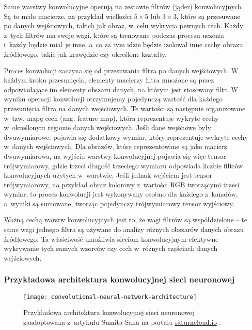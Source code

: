 Same warstwy konwolucyjne operują na zestawie filtrów (jąder) konwolucyjnych.
Są to małe macierze, na przykład wielkości $5 \times 5$ lub $3 \times 3$, które są przesuwane po danych wejściowych, takich jak obraz, w~celu wykrycia pewnych cech.
Każdy z~tych filtrów ma swoje wagi, które są trenowane podczas procesu uczenia i~każdy będzie miał je inne, a~co za tym idzie będzie izolował inne cechy obrazu źródłowego, takie jak krawędzie czy określone kształty.

Proces konwolucji zaczyna się od przesuwania filtra po danych wejściowych.
W każdym kroku przesunięcia, elementy macierzy filtra mnożone są przez odpowiadające im elementy obszaru danych, na którym jest stosowany filtr.
W wyniku operacji konwolucji otrzymujemy pojedynczą wartość dla każdego przesunięcia filtra na danych wejściowych.
Te wartości są następnie organizowane w~tzw. mapę cech (ang. feature map), która reprezentuje wykryte cechy w~określonym regionie danych wejściowych.
Jeśli dane wejściowe były dwuwymiarowe, pojawia się dodatkowy wymiar, który reprezentuje wykryte cechy w~danych wejściowych.
Dla obrazów, które reprezentowane są jako macierz dwuwymiarowa, na wyjściu warstwy konwolucyjnej pojawia się więc tensor trójwymiarowy, gdzie trzeci długość trzeciego wymiaru odpowiada liczbie filtrów konwolucyjnych użytych w~warstwie.
Jeśli jednak wejściem jest tensor trójwymiarowy, na przykład obraz kolorowy z~wartości RGB tworzącymi trzeci wymiar, to proces konwolucji jest wykonywany osobno dla każdego z~kanałów, a~wyniki są sumowane, tworząc pojedynczy trójwymiarowy tensor wyjściowy.

Ważną cechą warstw konwolucyjnych jest to, że wagi filtrów są współdzielone -- te same wagi jednego filtra są używane do analizy różnych obszarów danych obrazu źródłowego.
Ta właściwość umożliwia sieciom konwolucyjnym efektywne wykrywanie tych samych wzorców czy cech w~różnych częściach danych wejściowych.

\subsubsection{Przykładowa architektura konwolucyjnej sieci neuronowej}

\begin{figure}[ht]
  \texttt{[image: convolutional-neural-network-architecture]}
  \caption[Przykładowa architektura konwolucyjnej sieci neuronowej]{Przykładowa architektura konwolucyjnej sieci neuronowej zaadoptowana z~artykułu Sumita Saha na portalu \url{saturncloud.io} \cite{saha2018comprehensive}.}
  \label{fig:convolutional-neural-network-architecture}
\end{figure}

